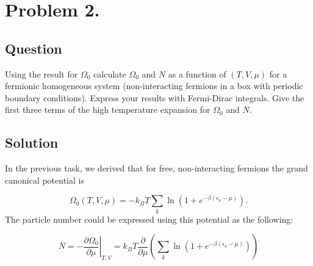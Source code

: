 \section*{Problem 2.}
\subsection*{Question}
Using the result for $\Omega_{0}$ calculate $\Omega_{0}$ and $N$ as a function of $(T, V, \mu)$ for a fermionic homogeneous system (non-interacting fermions in a box with periodic boundary conditions). Express your results with Fermi-Dirac integrals. Give the first three terms of the high temperature expansion for $\Omega_{0}$ and $N$.

\subsection*{Solution}
In the previous task, we derived that for free, non-interacting fermions the grand canonical potential is

\begin{equation} \label{eq:13}
\Omega_{0} \left( T, V, \mu \right)
=
-k_{B} T \sum_{k} \ln \left( 1 + e^{-\beta \left( \epsilon_{k} - \mu \right)} \right).
\end{equation}
The particle number could be expressed using this potential as the following:

\begin{equation} \label{eq:14}
N
=
- \left. \frac{\partial \Omega_{0}}{\partial \mu} \right|_{T,V}
=
k_{B} T \frac{\partial}{\partial \mu} \left( \sum_{k} \ln \left( 1 + e^{-\beta \left( \epsilon_{k} - \mu \right)} \right) \right)
\end{equation}
